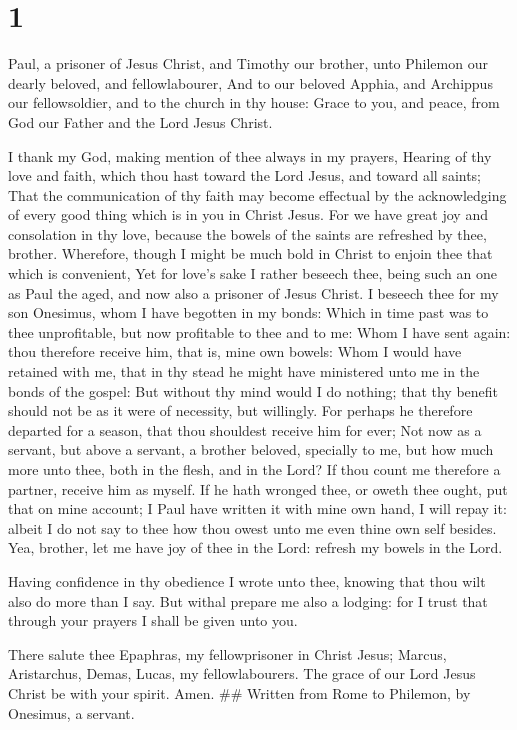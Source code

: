 \hypertarget{section}{%
\section{1}\label{section}}

 Paul, a prisoner of Jesus Christ, and Timothy our
brother, unto Philemon our dearly beloved, and fellowlabourer,
 And to our beloved Apphia, and Archippus our
fellowsoldier, and to the church in thy house:  Grace to
you, and peace, from God our Father and the Lord Jesus Christ.

 I thank my God, making mention of thee always in my
prayers,  Hearing of thy love and faith, which thou hast
toward the Lord Jesus, and toward all saints;  That the
communication of thy faith may become effectual by the acknowledging of
every good thing which is in you in Christ Jesus.  For we
have great joy and consolation in thy love, because the bowels of the
saints are refreshed by thee, brother.  Wherefore, though
I might be much bold in Christ to enjoin thee that which is convenient,
 Yet for love's sake I rather beseech thee, being such an
one as Paul the aged, and now also a prisoner of Jesus Christ.
 I beseech thee for my son Onesimus, whom I have begotten
in my bonds:  Which in time past was to thee
unprofitable, but now profitable to thee and to me:  Whom
I have sent again: thou therefore receive him, that is, mine own bowels:
 Whom I would have retained with me, that in thy stead he
might have ministered unto me in the bonds of the gospel:
 But without thy mind would I do nothing; that thy
benefit should not be as it were of necessity, but willingly.
 For perhaps he therefore departed for a season, that
thou shouldest receive him for ever;  Not now as a
servant, but above a servant, a brother beloved, specially to me, but
how much more unto thee, both in the flesh, and in the Lord?
 If thou count me therefore a partner, receive him as
myself.  If he hath wronged thee, or oweth thee ought,
put that on mine account;  I Paul have written it with
mine own hand, I will repay it: albeit I do not say to thee how thou
owest unto me even thine own self besides.  Yea, brother,
let me have joy of thee in the Lord: refresh my bowels in the Lord.

 Having confidence in thy obedience I wrote unto thee,
knowing that thou wilt also do more than I say.  But
withal prepare me also a lodging: for I trust that through your prayers
I shall be given unto you.

 There salute thee Epaphras, my fellowprisoner in Christ
Jesus;  Marcus, Aristarchus, Demas, Lucas, my
fellowlabourers.  The grace of our Lord Jesus Christ be
with your spirit. Amen. \#\# Written from Rome to Philemon, by Onesimus,
a servant.
